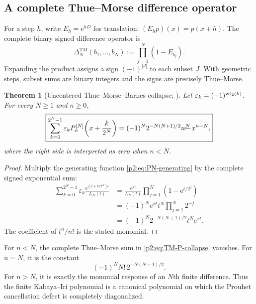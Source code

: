 \documentclass[11pt,oneside]{article}
\numberwithin{equation}{section}
\newtheorem{theorem}{Theorem}[section]
\theoremstyle{definition}
\theoremstyle{remark}
\newcommand{\e}{\mathrm e}
\newcommand{\eps}{\varepsilon}
\begin{document}
\subsection{A complete Thue--Morse difference operator}

For a step $h$, write $E_h=\e^{hD}$ for translation: $(E_hp)(x)=p(x+h)$.  The complete binary
signed difference operator is
\begin{equation}
 \Delta_N^{\mathrm{TM}}(b_1,\ldots,b_N)
 :=\prod_{j=1}^{N}(1-E_{b_j}).
 \label{p2:eq:TM-operator}
\end{equation}
Expanding the product assigns a sign $(-1)^{|J|}$ to each subset $J$.  With geometric steps, subset
sums are binary integers and the signs are precisely Thue--Morse.

\begin{theorem}[Uncentered Thue--Morse--Barnes collapse; \statusnew]
\label{p2:thm:TM-uncentered}
Let $\eps_k=(-1)^{\wt(k)}$.  For every $N\ge1$ and $n\ge0$,
\begin{equation}
 \boxed{
 \sum_{k=0}^{2^N-1}\eps_k
 P_n^{[N]}\!\left(x+\frac{k}{2^N}\right)
 =(-1)^N2^{-N(N+1)/2}\fall nN\,x^{n-N},
 }
 \label{p2:eq:TM-P-collapse}
\end{equation}
where the right side is interpreted as zero when $n<N$.
\end{theorem}

\begin{proof}
Multiply the generating function \eqref{p2:eq:PN-generating} by the complete signed exponential sum:
\begin{align*}
 \sum_{k=0}^{2^N-1}\eps_k
 \frac{\e^{(x+k/2^N)t}}{L_N(t)}
 &=\frac{\e^{xt}}{L_N(t)}
   \prod_{j=1}^{N}(1-\e^{t/2^j})\\
 &=(-1)^N\e^{xt}t^N\prod_{j=1}^{N}2^{-j}\\
 &=(-1)^N2^{-N(N+1)/2}t^N\e^{xt}.
\end{align*}
The coefficient of $t^n/n!$ is the stated monomial.
\end{proof}

\begin{corollary}
\label{p2:cor:Prouhet-canonical}
For $n<N$, the complete Thue--Morse sum in \eqref{p2:eq:TM-P-collapse} vanishes.  For $n=N$, it is the
constant
\begin{equation}
 (-1)^NN!\,2^{-N(N+1)/2}.
 \label{p2:eq:TM-first-nonzero}
\end{equation}
For $n>N$, it is exactly the monomial response of an $N$th finite difference.  Thus the finite
Kabaya--Iri polynomial is a canonical polynomial on which the Prouhet cancellation defect is
completely diagonalized.
\end{corollary}
\end{document}
